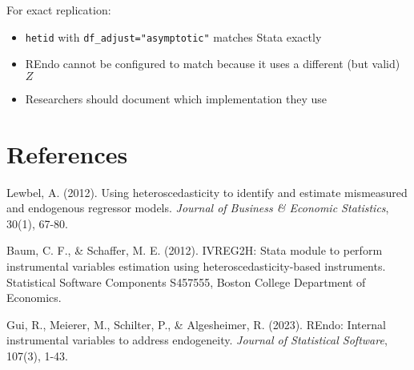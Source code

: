 \documentclass[12pt]{article}
\begin{document}
For exact replication:
\begin{itemize}
\item \texttt{hetid} with \texttt{df\_adjust="asymptotic"} matches Stata exactly
\item REndo cannot be configured to match because it uses a different (but valid) $Z$
\item Researchers should document which implementation they use
\end{itemize}

\section*{References}

Lewbel, A. (2012). Using heteroscedasticity to identify and estimate mismeasured and endogenous regressor models. \textit{Journal of Business \& Economic Statistics}, 30(1), 67-80.

Baum, C. F., \& Schaffer, M. E. (2012). IVREG2H: Stata module to perform instrumental variables estimation using heteroscedasticity-based instruments. Statistical Software Components S457555, Boston College Department of Economics.

Gui, R., Meierer, M., Schilter, P., \& Algesheimer, R. (2023). REndo: Internal instrumental variables to address endogeneity. \textit{Journal of Statistical Software}, 107(3), 1-43.
\end{document}
